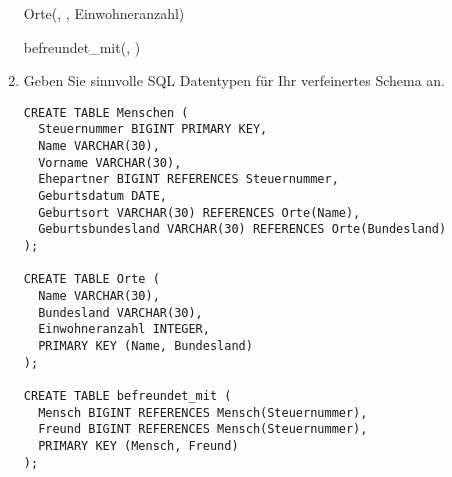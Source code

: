 \documentclass{lehramt-informatik-aufgabe}
\begin{document}
\begin{enumerate}
\begin{liAntwort}
\begin{liRmodell}
Orte(, , Einwohneranzahl)

befreundet\_mit(, )
\end{liRmodell}
\end{liAntwort}


\item Geben Sie sinnvolle SQL Datentypen für Ihr verfeinertes Schema an.

\begin{liAntwort}
\begin{verbatim}
CREATE TABLE Menschen (
  Steuernummer BIGINT PRIMARY KEY,
  Name VARCHAR(30),
  Vorname VARCHAR(30),
  Ehepartner BIGINT REFERENCES Steuernummer,
  Geburtsdatum DATE,
  Geburtsort VARCHAR(30) REFERENCES Orte(Name),
  Geburtsbundesland VARCHAR(30) REFERENCES Orte(Bundesland)
);

CREATE TABLE Orte (
  Name VARCHAR(30),
  Bundesland VARCHAR(30),
  Einwohneranzahl INTEGER,
  PRIMARY KEY (Name, Bundesland)
);

CREATE TABLE befreundet_mit (
  Mensch BIGINT REFERENCES Mensch(Steuernummer),
  Freund BIGINT REFERENCES Mensch(Steuernummer),
  PRIMARY KEY (Mensch, Freund)
);
\end{verbatim}
\end{liAntwort}

\end{enumerate}
\end{document}
